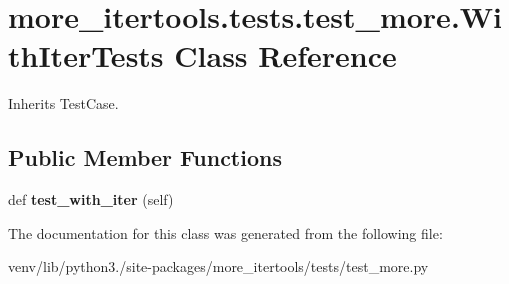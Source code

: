 \hypertarget{classmore__itertools_1_1tests_1_1test__more_1_1_with_iter_tests}{}\section{more\+\_\+itertools.\+tests.\+test\+\_\+more.\+With\+Iter\+Tests Class Reference}
\label{classmore__itertools_1_1tests_1_1test__more_1_1_with_iter_tests}


Inherits Test\+Case.

\subsection*{Public Member Functions}
\begin{DoxyCompactItemize}
\item 
\mbox{\label{classmore__itertools_1_1tests_1_1test__more_1_1_with_iter_tests_a104fe3f47206ea2fa09ddca00e57db10}} 
def {\bfseries test\+\_\+with\+\_\+iter} (self)
\end{DoxyCompactItemize}


The documentation for this class was generated from the following file\+:\begin{DoxyCompactItemize}
\item 
venv/lib/python3./site-\/packages/more\+\_\+itertools/tests/test\+\_\+more.\+py\end{DoxyCompactItemize}
